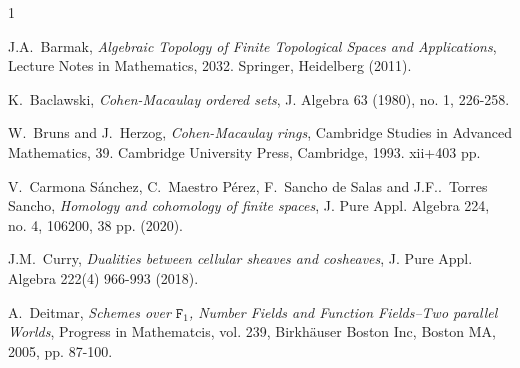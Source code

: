 \documentclass[amssymb,amscd,11pt,20pt]{amsart}
\newcommand{\FF}{{\mathtt F}}
\newcommand{\0}{\mathbf 0}
\theoremstyle{plain}
\numberwithin{equation}{thm}
\begin{document}
\begin{thebibliography}{1}	

%
%
%
%
%
 {\sc J.A.~Barmak}, {\em Algebraic Topology of Finite Topological Spaces and Applications}, Lecture Notes in Mathematics, 2032. Springer, Heidelberg (2011).
%
%
%



 


  
 {\sc  K.~Baclawski}, {\em Cohen-Macaulay ordered sets}, J. Algebra 63 (1980), no. 1, 226-258.

 {\sc  W.~Bruns and J.~Herzog}, {\em Cohen-Macaulay rings}, 
Cambridge Studies in Advanced Mathematics, 39. Cambridge University Press, Cambridge, 1993. xii+403 pp.

 {\sc V.~Carmona S\'anchez, C.~Maestro P\'erez, F.~Sancho de Salas   and J.F..~Torres Sancho}, {\em Homology and cohomology of finite spaces}, J. Pure Appl. Algebra 224, no. 4, 106200, 38 pp.  (2020).
  
 {\sc J.M.~Curry}, {\em Dualities between cellular sheaves and cosheaves}, J. Pure Appl. Algebra 222(4)  966-993 (2018).

 {\sc  A.~Deitmar}, {\em Schemes over $\FF_1$, 
Number Fields and Function Fields--Two parallel Worlds}, Progress in Mathematcis, vol. 239, Birkh{\"a}user Boston Inc, Boston MA, 2005, pp. 87-100.
 

\end{thebibliography}
\end{document}
